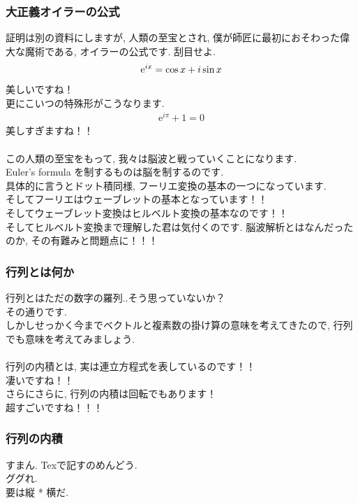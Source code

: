 \documentclass[11pt,a4paper]{jsarticle}
\begin{document}
\subsubsection{大正義オイラーの公式}
証明は別の資料にしますが, 人類の至宝とされ, 僕が師匠に最初におそわった偉大な魔術である, オイラーの公式です. 刮目せよ.\\
\begin{eqnarray}
\mathrm{e}^{ix} = \cos x + \mathstrut i\sin x
\label{eq:euler}
\end{eqnarray}
美しいですね！\\
更にこいつの特殊形がこうなります.\\
\begin{eqnarray}
\mathrm{e}^{i\pi} + 1 = 0
\end{eqnarray}
美しすぎますね！！\\
\\
この人類の至宝をもって, 我々は脳波と戦っていくことになります.\\
Euler's formula を制するものは脳を制するのです.\\
具体的に言うとドット積同様, フーリエ変換の基本の一つになっています. \\
そしてフーリエはウェーブレットの基本となっています！！\\
そしてウェーブレット変換はヒルベルト変換の基本なのです！！\\
そしてヒルベルト変換まで理解した君は気付くのです. 脳波解析とはなんだったのか, その有難みと問題点に！！！\\

\subsubsection{行列とは何か}
行列とはただの数字の羅列..そう思っていないか？\\
その通りです.\\
しかしせっかく今までベクトルと複素数の掛け算の意味を考えてきたので, 行列でも意味を考えてみましょう.\\
\\
行列の内積とは, 実は連立方程式を表しているのです！！\\
凄いですね！！\\
さらにさらに, 行列の内積は回転でもあります！\\
超すごいですね！！！\\
\subsubsection{行列の内積}
すまん. Texで記すのめんどう. 
\\
ググれ.
\\
要は縦 * 横だ.\\
\end{document}
